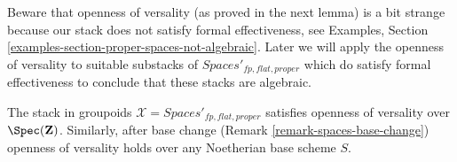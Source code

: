 \noindent
Beware that openness of versality (as proved in the next lemma)
is a bit strange because our stack does not satisfy formal effectiveness, see
Examples, Section \ref{examples-section-proper-spaces-not-algebraic}.
Later we will apply the openness of versality to suitable substacks of
$\textit{Spaces}'_{fp, flat, proper}$ which do satisfy
formal effectiveness to conclude that these stacks are algebraic.

\begin{lemma}
\label{lemma-spaces-defo-thy}
The stack in groupoids $\mathcal{X} = \textit{Spaces}'_{fp, flat, proper}$
satisfies openness of versality over $\Spec(\mathbf{Z})$.
Similarly, after base change (Remark \ref{remark-spaces-base-change})
openness of versality holds over any Noetherian base scheme $S$.
\end{lemma}

